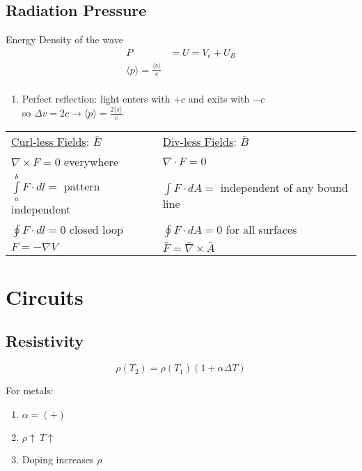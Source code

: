 \documentclass[10pt,a4paper]{article}
\begin{document}
\subsection{Radiation Pressure}
Energy Density of the wave
\begin{align}
  P &= U = V_e + U_B\\
  \langle p \rangle = \frac{\langle s \rangle}{c}\\
\end{align}

\begin{enumerate}
    \item Perfect reflection: light enters with $+c$ and exits with $-c$\\
        so $\Delta v = 2c \rightarrow \langle p \rangle = \frac{2 \langle s \rangle}{c}$
\end{enumerate}

\begin{tabular} {l l}
    \underline{Curl-less Fields}: $\bar{E}$ & \underline{Div-less Fields}: $\bar{B}$\\
    $\nabla \times F= 0$ everywhere & $\nabla \cdot F = 0$\\
    $\int \limits_a^b F \cdot dl = $ pattern independent & $\int F\cdot dA = $ independent of any bound line\\
    $\oint F \cdot dl = 0$ closed loop & $\oint F \cdot dA = 0 $ for all surfaces \\
    $F = -\nabla V$ & $\bar{F} = \bar{\nabla} \times \bar{A}$
\end{tabular}


\section{Circuits}

\subsection{Resistivity}
\begin{equation}
 \rho(T_2) = \rho(T_1)(1+\alpha\Delta T) 
\end{equation}

For metals:
\begin{enumerate}
  \item $\alpha = (+)$
  \item $\rho \uparrow ~ T \uparrow$
  \item Doping increases $\rho$
\end{enumerate}
\end{document}
